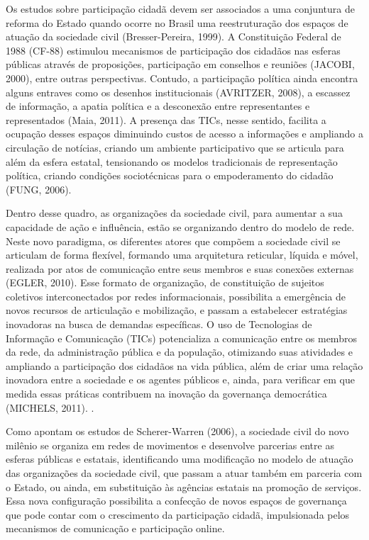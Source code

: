 Os estudos sobre participação cidadã devem ser associados a uma
conjuntura de reforma do Estado quando ocorre no Brasil uma
reestruturação dos espaços de atuação da sociedade civil
(Bresser-Pereira, 1999). A Constituição Federal de 1988 (CF-88)
estimulou mecanismos de participação dos cidadãos nas esferas públicas
através de proposições, participação em conselhos e reuniões (JACOBI,
2000), entre outras perspectivas. Contudo, a participação política ainda
encontra alguns entraves como os desenhos institucionais (AVRITZER,
2008), a escassez de informação, a apatia política e a desconexão entre
representantes e representados (Maia, 2011). A presença das TICs, nesse
sentido, facilita a ocupação desses espaços diminuindo custos de acesso
a informações e ampliando a circulação de notícias, criando um ambiente
participativo que se articula para além da esfera estatal, tensionando
os modelos tradicionais de representação política, criando condições
sociotécnicas para o empoderamento do cidadão (FUNG, 2006).

Dentro desse quadro, as organizações da sociedade civil, para aumentar a
sua capacidade de ação e influência, estão se organizando dentro do
modelo de rede. Neste novo paradigma, os diferentes atores que compõem a
sociedade civil se articulam de forma flexível, formando uma arquitetura
reticular, líquida e móvel, realizada por atos de comunicação entre seus
membros e suas conexões externas (EGLER, 2010). Esse formato de
organização, de constituição de sujeitos coletivos interconectados por
redes informacionais, possibilita a emergência de novos recursos de
articulação e mobilização, e passam a estabelecer estratégias inovadoras
na busca de demandas específicas. O uso de Tecnologias de Informação e
Comunicação (TICs) potencializa a comunicação entre os membros da rede,
da administração pública e da população, otimizando suas atividades e
ampliando a participação dos cidadãos na vida pública, além de criar uma
relação inovadora entre a sociedade e os agentes públicos e, ainda, para
verificar em que medida essas práticas contribuem na inovação da
governança democrática (MICHELS, 2011). .

Como apontam os estudos de Scherer-Warren (2006), a sociedade civil do
novo milênio se organiza em redes de movimentos e desenvolve parcerias
entre as esferas públicas e estatais, identificando uma modificação no
modelo de atuação das organizações da sociedade civil, que passam a
atuar também em parceria com o Estado, ou ainda, em substituição às
agências estatais na promoção de serviços. Essa nova configuração
possibilita a confecção de novos espaços de governança que pode contar
com o crescimento da participação cidadã, impulsionada pelos mecanismos
de comunicação e participação online.

